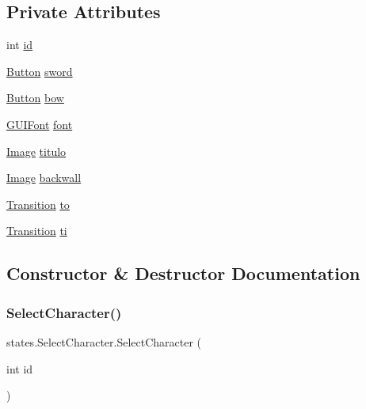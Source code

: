 \subsection*{Private Attributes}
\begin{DoxyCompactItemize}
\item 
int \mbox{\hyperlink{classstates_1_1_select_character_a5c1f6e40502826b9d1b8ece9e66f08a5}{id}}
\item 
\mbox{\hyperlink{classgui_1_1_button}{Button}} \mbox{\hyperlink{classstates_1_1_select_character_af4275da4746fa27d2db5b23c55e70cf4}{sword}}
\item 
\mbox{\hyperlink{classgui_1_1_button}{Button}} \mbox{\hyperlink{classstates_1_1_select_character_ade5eda408476aabd909efe788573df89}{bow}}
\item 
\mbox{\hyperlink{classgui_1_1_g_u_i_font}{G\+U\+I\+Font}} \mbox{\hyperlink{classstates_1_1_select_character_aacd9a8008cf64ff8e04eb05d0af88ce7}{font}}
\item 
\mbox{\hyperlink{classorg_1_1newdawn_1_1slick_1_1_image}{Image}} \mbox{\hyperlink{classstates_1_1_select_character_a08562d62626aed4d70fdd3df76f3bf0e}{titulo}}
\item 
\mbox{\hyperlink{classorg_1_1newdawn_1_1slick_1_1_image}{Image}} \mbox{\hyperlink{classstates_1_1_select_character_ad3efe515775d6b2f543ff024b73c0db8}{backwall}}
\item 
\mbox{\hyperlink{interfaceorg_1_1newdawn_1_1slick_1_1state_1_1transition_1_1_transition}{Transition}} \mbox{\hyperlink{classstates_1_1_select_character_a68834105cf56b725541f4fb94ca14d31}{to}}
\item 
\mbox{\hyperlink{interfaceorg_1_1newdawn_1_1slick_1_1state_1_1transition_1_1_transition}{Transition}} \mbox{\hyperlink{classstates_1_1_select_character_af8f40fad4e926ebbb979340c12ecb326}{ti}}
\end{DoxyCompactItemize}


\subsection{Constructor \& Destructor Documentation}
\mbox{\label{classstates_1_1_select_character_a9062e830d534afc91e4f79940aed82b9}} 
\subsubsection{\texorpdfstring{Select\+Character()}{SelectCharacter()}}
{\footnotesize\ttfamily states.\+Select\+Character.\+Select\+Character (\begin{DoxyParamCaption}\item[{int}]{id }\end{DoxyParamCaption})\hspace{0.3cm}{\ttfamily [inline]}}


